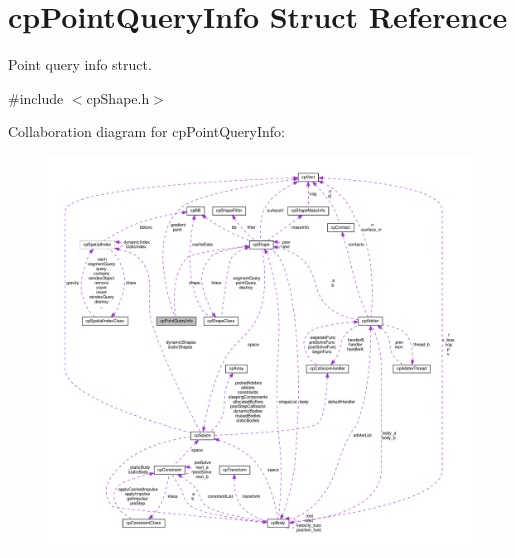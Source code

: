 \hypertarget{structcpPointQueryInfo}{}\section{cp\+Point\+Query\+Info Struct Reference}
\label{structcpPointQueryInfo}


Point query info struct.  




{\ttfamily \#include $<$cp\+Shape.\+h$>$}



Collaboration diagram for cp\+Point\+Query\+Info\+:
\nopagebreak
\begin{figure}[H]
\begin{center}
\leavevmode
\includegraphics[width=350pt]{structcpPointQueryInfo__coll__graph}
\end{center}
\end{figure}
